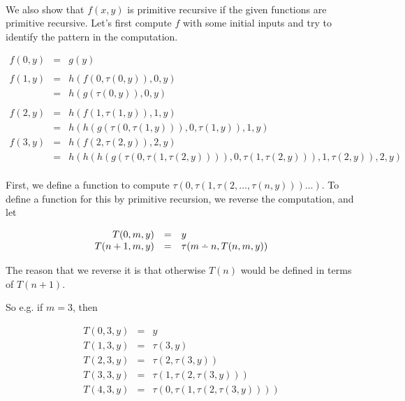 \documentclass{article}
\providecommand{\dotdiv}{%
  \mathbin{%
    \vphantom{+}%
    \text{%
      \mathsurround=0pt %
      \ooalign{%
        \noalign{\kern-.35ex}%
        \hidewidth$\smash{\cdot}$\hidewidth\cr %
        \noalign{\kern.35ex}%
        $-$\cr %
      }%
    }%
  }%
}
\begin{document}
\paragraph{} We also show that $f(x,y)$ is primitive recursive if the given
functions are primitive recursive. Let's first compute $f$ with some
initial inputs and try to identify the pattern in the computation.

\[
\begin{array}{rcl}
  f(0,y) & = & g(y) \\ \\
  
  f(1, y) & = & h(f(0,\tau (0,y)), 0, y) \\
  & = & h(g(\tau (0,y)), 0, y) \\ \\

  f(2, y) & = & h(f(1,\tau (1,y)), 1, y) \\
  & = & h(h(g(\tau (0, \tau (1,y))),0,\tau (1,y)), 1, y) \\

  f(3, y) & = & h(f(2,\tau (2,y)), 2, y) \\
  & = & h(h(h(g(\tau (0, \tau (1, \tau (2, y)))),0,\tau (1, \tau (2, y))), 1, \tau (2,y)), 2, y)
\end{array} 
\]

\paragraph{} First, we define a function to compute $\tau (0, \tau (1, \tau (2, \ldots, \tau (n, y))) \ldots )$. To define a function for this by primitive recursion, we reverse the computation, and let

\[
\begin{array}{rcl}
  T(0,m,y) & = & y \\
  T(n+1,m,y) & = & \tau (m \dotdiv n, T(n,m,y))
\end{array} 
\]

The reason that we reverse it is that otherwise $T(n)$ would be
defined in terms of $T(n+1)$.

So e.g. if $m=3$, then

\[
\begin{array}{rcl}
  T(0,3,y) & = & y \\
  T(1,3,y) & = & \tau(3,y) \\
  T(2,3,y) & = & \tau(2, \tau (3,y)) \\
  T(3,3,y) & = & \tau(1, \tau(2, \tau (3,y))) \\
  T(4,3,y) & = & \tau(0,\tau(1, \tau(2, \tau (3,y)))) \\
\end{array} 
\]
\end{document}
